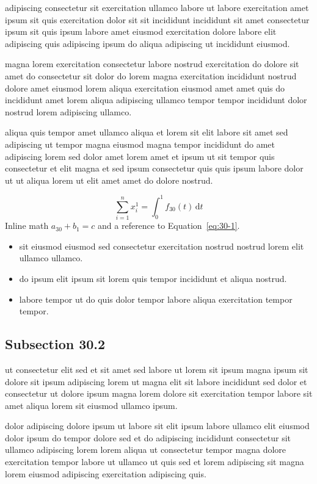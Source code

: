 \documentclass{article}
\begin{document}
adipiscing consectetur sit exercitation ullamco labore ut labore exercitation amet ipsum sit quis exercitation dolor sit sit incididunt incididunt sit amet consectetur ipsum sit quis ipsum labore amet eiusmod exercitation dolore labore elit adipiscing quis adipiscing ipsum do aliqua adipiscing ut incididunt eiusmod.

magna lorem exercitation consectetur labore nostrud exercitation do dolore sit amet do consectetur sit dolor do lorem magna exercitation incididunt nostrud dolore amet eiusmod lorem aliqua exercitation eiusmod amet amet quis do incididunt amet lorem aliqua adipiscing ullamco tempor tempor incididunt dolor nostrud lorem adipiscing ullamco.

aliqua quis tempor amet ullamco aliqua et lorem sit elit labore sit amet sed adipiscing ut tempor magna eiusmod magna tempor incididunt do amet adipiscing lorem sed dolor amet lorem amet et ipsum ut sit tempor quis consectetur et elit magna et sed ipsum consectetur quis quis ipsum labore dolor ut ut aliqua lorem ut elit amet amet do dolore nostrud.

\begin{equation}\label{eq:30-1}
  \sum_{i=1}^{n} x_i^{1} = \int_0^1 f_{30}(t)\,\mathrm{d}t
\end{equation}
Inline math $a_{30} + b_{1} = c$ and a reference to Equation~\eqref{eq:30-1}.

\begin{itemize}
  \item sit eiusmod eiusmod sed consectetur exercitation nostrud nostrud lorem elit ullamco ullamco.
  \item do ipsum elit ipsum sit lorem quis tempor incididunt et aliqua nostrud.
  \item labore tempor ut do quis dolor tempor labore aliqua exercitation tempor tempor.
\end{itemize}

\subsection{Subsection 30.2}\label{sec:30-2}
ut consectetur elit sed et sit amet sed labore ut lorem sit ipsum magna ipsum sit dolore sit ipsum adipiscing lorem ut magna elit sit labore incididunt sed dolor et consectetur ut dolore ipsum magna lorem dolore sit exercitation tempor labore sit amet aliqua lorem sit eiusmod ullamco ipsum.

dolor adipiscing dolore ipsum ut labore sit elit ipsum labore ullamco elit eiusmod dolor ipsum do tempor dolore sed et do adipiscing incididunt consectetur sit ullamco adipiscing lorem lorem aliqua ut consectetur tempor magna dolore exercitation tempor labore ut ullamco ut quis sed et lorem adipiscing sit magna lorem eiusmod adipiscing exercitation adipiscing quis.
\end{document}
